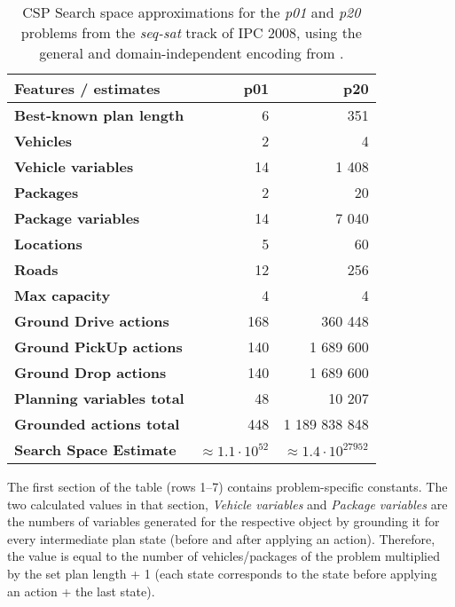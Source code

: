 {\begin{table}[tb]
\begin{center}
\begin{tabular}{l||rr}
\textbf{Features / estimates} & \textbf{p01} & \textbf{p20} \\ 
\midrule
\midrule
\textbf{Best-known plan length} & 6 & 351 \\ 
\textbf{Vehicles} & 2 & 4 \\ 
\textbf{Vehicle variables} & 14 & 1 408 \\ 
\textbf{Packages} & 2 & 20 \\ 
\textbf{Package variables} & 14 & 7 040 \\ 
\textbf{Locations} & 5 & 60 \\ 
\textbf{Roads} & 12 & 256 \\
\textbf{Max capacity} & 4 & 4 \\ 
\midrule
\textbf{Ground Drive actions} & 168 & 360 448 \\ 
\textbf{Ground PickUp actions} & 140 & 1 689 600 \\ 
\textbf{Ground Drop actions} & 140 & 1 689 600 \\ 
\midrule
\textbf{Planning variables total} & 48 & 10 207 \\ 
\textbf{Grounded actions total} & 448 & 1 189 838 848 \\ 
\textbf{Search Space Estimate} & $\approx 1.1 \cdot 10^{52}$ & $\approx 1.4 \cdot 10^{27 952}$ \\ %
\end{tabular}
\end{center}
\caption[Search space approximations for a na{\"{i}}ve CSP encoding.]{CSP Search space approximations for the \textit{p01} and \textit{p20} problems from the \textit{seq-sat} track of IPC 2008, using the general and domain-independent encoding from \citet[Section~8.3]{Ghallab2004}.}
\label{tab:csp-trivial}
\end{table}

The first section of the table (rows 1--7) contains problem-specific constants.
The two calculated values in that section, \textit{Vehicle variables} and \textit{Package variables} are the numbers of variables generated for the respective
object by grounding it for every intermediate plan state (before and after applying an action). Therefore, the value is equal to the number of vehicles/packages of the problem
multiplied by the set plan length + 1 (each state corresponds to the state before applying an action + the last state).

}
